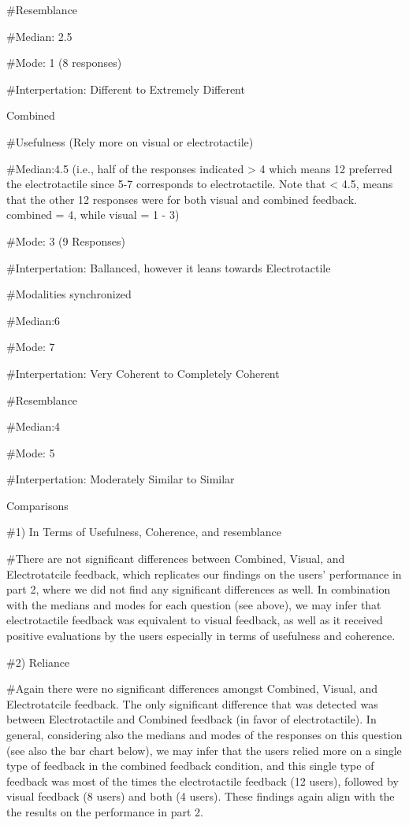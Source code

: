 \documentclass[
]{article}
\begin{document}
\#Resemblance

\#Median: 2.5

\#Mode: 1 (8 responses)

\#Interpertation: Different to Extremely Different

Combined

\#Usefulness (Rely more on visual or electrotactile)

\#Median:4.5 (i.e., half of the responses indicated \textgreater{} 4
which means 12 preferred the electrotactile since 5-7 corresponds to
electrotactile. Note that \textless{} 4.5, means that the other 12
responses were for both visual and combined feedback. combined = 4,
while visual = 1 - 3)

\#Mode: 3 (9 Responses)

\#Interpertation: Ballanced, however it leans towards Electrotactile

\#Modalities synchronized

\#Median:6

\#Mode: 7

\#Interpertation: Very Coherent to Completely Coherent

\#Resemblance

\#Median:4

\#Mode: 5

\#Interpertation: Moderately Similar to Similar

Comparisons

\#1) In Terms of Usefulness, Coherence, and resemblance

\#There are not significant differences between Combined, Visual, and
Electrotatcile feedback, which replicates our findings on the users'
performance in part 2, where we did not find any significant differences
as well. In combination with the medians and modes for each question
(see above), we may infer that electrotactile feedback was equivalent to
visual feedback, as well as it received positive evaluations by the
users especially in terms of usefulness and coherence.

\#2) Reliance

\#Again there were no significant differences amongst Combined, Visual,
and Electrotatcile feedback. The only significant difference that was
detected was between Electrotactile and Combined feedback (in favor of
electrotactile). In general, considering also the medians and modes of
the responses on this question (see also the bar chart below), we may
infer that the users relied more on a single type of feedback in the
combined feedback condition, and this single type of feedback was most
of the times the electrotactile feedback (12 users), followed by visual
feedback (8 users) and both (4 users). These findings again align with
the the results on the performance in part 2.
\end{document}
